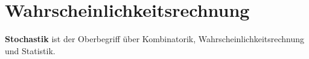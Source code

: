 \part{Wahrscheinlichkeitsrechnung}

\textbf{Stochastik} ist der Oberbegriff über
Kombinatorik, Wahrscheinlichkeitsrechnung und Statistik.

\renewcommand{\bbwPartID}{STOCH}
%
%
%
%



\newpage
